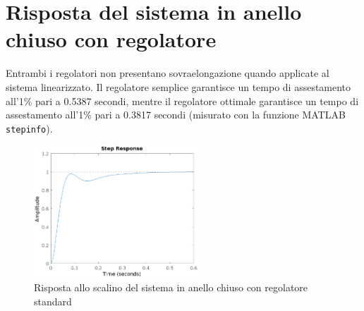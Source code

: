 \documentclass[a4paper]{article}
\begin{document}
\section{Risposta del sistema in anello chiuso con regolatore}
Entrambi i regolatori non presentano sovraelongazione quando applicate al sistema linearizzato.
Il regolatore semplice garantisce un tempo di assestamento all'1\% pari a 0.5387 secondi, mentre il regolatore ottimale garantisce un tempo di assestamento all'1\% pari a 0.3817 secondi (misurato con la funzione MATLAB \texttt{stepinfo}).
\begin{figure}[h!]
    \centering
    \includegraphics[width=0.55\textwidth]{step}
    \caption{Risposta allo scalino del sistema in anello chiuso con regolatore standard}
    \label{fig:step_standard}
\end{figure}
\end{document}
